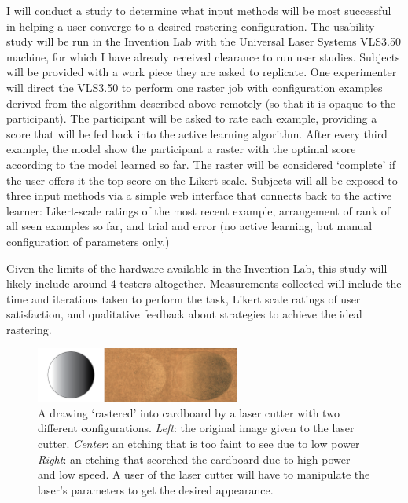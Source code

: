\documentclass[12pt]{article}
\begin{document}
I will conduct a study to determine what input methods will be most successful in helping a user converge to a desired rastering configuration.
The usability study will be run in the Invention Lab with the Universal Laser Systems VLS3.50 machine, for which I have already received clearance to run user studies.
Subjects will be provided with a work piece they are asked to replicate.
One experimenter will direct the VLS3.50 to perform one raster job with configuration examples derived from the algorithm described above remotely (so that it is opaque to the participant).
The participant will be asked to rate each example, providing a score that will be fed back into the active learning algorithm.
After every third example, the model show the participant a raster with the optimal score according to the model learned so far.
The raster will be considered `complete' if the user offers it the top score on the Likert scale.
Subjects will all be exposed to three input methods via a simple web interface that connects back to the active learner:
Likert-scale ratings of the most recent example, arrangement of rank of all seen examples so far, and trial and error (no active learning, but manual configuration of parameters only.)

Given the limits of the hardware available in the Invention Lab, this study will likely include around 4 testers altogether.
Measurements collected will include the time and iterations taken to perform the task, Likert scale ratings of user satisfaction, and qualitative feedback about strategies to achieve the ideal rastering.

\begin{figure}
  \centering
  \includegraphics[width=0.6\textwidth]{figures/rasters}
  \caption{\small{%
  A drawing `rastered' into cardboard by a laser cutter with two different configurations.
  \emph{Left}: the original image given to the laser cutter.
  \emph{Center}: an etching that is too faint to see due to low power
  \emph{Right}: an etching that scorched the cardboard due to high power and low speed.
  A user of the laser cutter will have to manipulate the laser's parameters to get the desired appearance.}}
\label{fig:rasters}
\end{figure}
\end{document}
